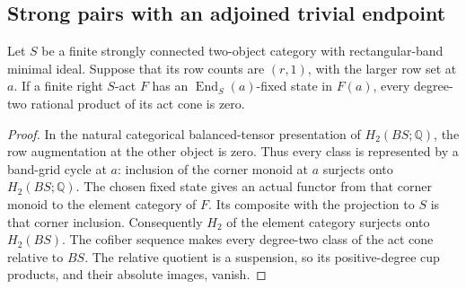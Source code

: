 \subsection{Strong pairs with an adjoined trivial endpoint}

\begin{lemma}\label{C:active-corner-fixed-state}
Let $S$ be a finite strongly connected two-object category with
rectangular-band minimal ideal. Suppose that its row counts are
$(r,1)$, with the larger row set at $a$. If a finite right
$S$-act $F$ has an $\operatorname{End}_S(a)$-fixed state in $F(a)$,
every degree-two rational product of its act cone is zero.
\end{lemma}
\begin{proof}
In the natural categorical balanced-tensor presentation of
$H_2(BS;\mathbb Q)$, the row augmentation at the other object
is zero. Thus every class is represented by a band-grid cycle
at $a$: inclusion of the corner monoid at $a$ surjects onto
$H_2(BS;\mathbb Q)$. The chosen fixed state gives an actual
functor from that corner monoid to the element category of $F$.
Its composite with the projection to $S$ is that corner inclusion.
Consequently $H_2$ of the element category surjects onto $H_2(BS)$.
The cofiber sequence makes every degree-two class of the act cone
relative to $BS$. The relative quotient is a suspension, so its
positive-degree cup products, and their absolute images, vanish.
\end{proof}

